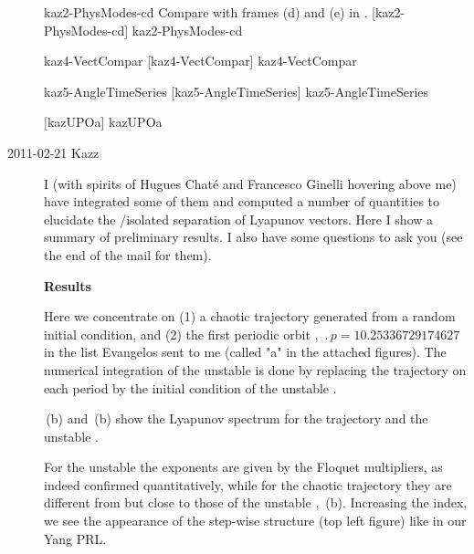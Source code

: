 \begin{description}
  {kaz2-PhysModes-cd}   %
  {}   %
  {    %
    Compare with frames (d) and (e) in .
    {\po}  [kaz2-PhysModes-cd]
  }
  {kaz2-PhysModes-cd}   %

  {kaz4-VectCompar}   %
  {}   %
  {    %
    {\po}  [kaz4-VectCompar]
  }
  {kaz4-VectCompar}   %

  {kaz5-AngleTimeSeries}   %
  {}   %
  {    %
    {\po}  [kaz5-AngleTimeSeries]
  }
  {kaz5-AngleTimeSeries}   %

  {}   %
  {    %
    {\po}  [kazUPOa]
  }
  {kazUPOa}   %

\item[2011-02-21 Kazz]
  I (with spirits of Hugues Chat\'e and Francesco Ginelli hovering above me)
  have integrated some of
  them and computed a number of quantities to elucidate the
  {\entangled}/isolated separation of Lyapunov vectors. Here I show a
  summary of preliminary results. I also have some questions to ask you
  (see the end of the mail for them).


  \textbf{Results}

  Here we concentrate on (1) a chaotic trajectory generated from a random
  initial condition, and (2) the first periodic orbit ,
  $\period{p}=10.25336729174627$ in the list
  Evangelos sent to me (called "{\po}a" in the attached
  figures). The numerical integration of the {unstable \po} is done by replacing the
  trajectory on each period by the initial condition of the {unstable \po}.

  \,(b)
  and
  \,(b)
  show the Lyapunov spectrum for
  the trajectory and the {unstable \po}.

  For the {unstable \po} the exponents are
  given by the Floquet multipliers, as indeed confirmed quantitatively,
  while for the chaotic trajectory they are different from but close to
  those of the {unstable \po}, \,(b).
  Increasing the index, we
  see the appearance of the step-wise structure (top left figure) like in
  our Yang \etal{} PRL.


\end{description}

